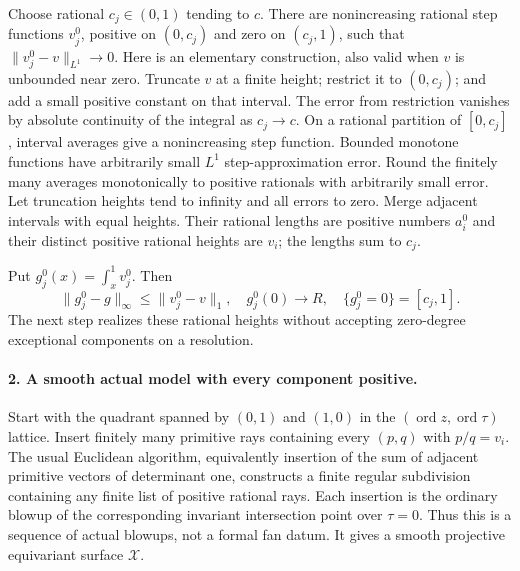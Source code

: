 \documentclass[11pt]{article}
\begin{document}
Choose rational $c_j\in(0,1)$ tending to $c$. There are nonincreasing
rational step functions $v_j^0$, positive on $(0,c_j)$ and zero on
$(c_j,1)$, such that $\|v_j^0-v\|_{L^1}\to0$. Here is an elementary
construction, also valid when $v$ is unbounded near zero. Truncate
$v$ at a finite height; restrict it to $(0,c_j)$; and add a small
positive constant on that interval. The error from restriction
vanishes by absolute continuity of the integral as $c_j\to c$.
On a rational partition of $[0,c_j]$, interval averages give a
nonincreasing step function. Bounded monotone functions have arbitrarily
small $L^1$ step-approximation error. Round the finitely many averages
monotonically to positive rationals with arbitrarily small error.
Let truncation heights tend to infinity and all errors to zero.
Merge adjacent intervals with equal heights. Their rational lengths
are positive numbers $a_i^0$ and their distinct positive rational
heights are $v_i$; the lengths sum to $c_j$.

Put $g_j^0(x)=\int_x^1v_j^0$. Then
\[
 \|g_j^0-g\|_\infty\le\|v_j^0-v\|_1,
 \quad g_j^0(0)\to R,\quad \{g_j^0=0\}=[c_j,1].       \tag{1}
\]
The next step realizes these rational heights without accepting
zero-degree exceptional components on a resolution.

\paragraph{2. A smooth actual model with every component positive.}
Start with the quadrant spanned by $(0,1)$ and $(1,0)$ in the
$(\operatorname{ord}z,\operatorname{ord}\tau)$ lattice. Insert finitely
many primitive rays containing every $(p,q)$ with $p/q=v_i$.
The usual Euclidean algorithm, equivalently insertion of the sum
of adjacent primitive vectors of determinant one, constructs a
finite regular subdivision containing any finite list of positive
rational rays. Each insertion is the ordinary blowup of the
corresponding invariant intersection point over $\tau=0$.
Thus this is a sequence of actual blowups, not a formal fan datum.
It gives a smooth projective equivariant surface $\mathcal X$.
\end{document}
